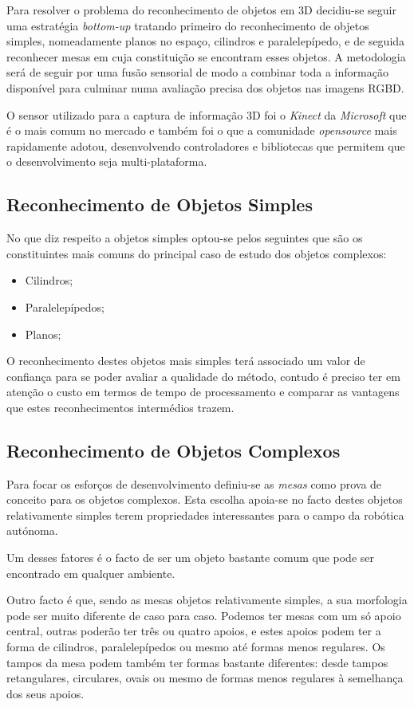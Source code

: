Para resolver o problema do reconhecimento de objetos em 3D decidiu-se seguir uma estratégia \emph{bottom-up} tratando primeiro do reconhecimento de objetos simples, nomeadamente planos no espaço, cilindros e paralelepípedo, e de seguida reconhecer mesas em cuja constituição se encontram esses objetos. A metodologia será de seguir por uma fusão sensorial de modo a combinar toda a informação disponível para culminar numa avaliação precisa dos objetos nas imagens RGBD.

O sensor utilizado para a captura de informação 3D foi o \emph{Kinect} da \emph{Microsoft} que é o mais comum no mercado e também foi o que a comunidade \emph{opensource} mais rapidamente adotou, desenvolvendo controladores e bibliotecas que permitem que o desenvolvimento seja multi-plataforma.


\subsection{Reconhecimento de Objetos Simples}

No que diz respeito a objetos simples optou-se pelos seguintes que são os constituintes mais comuns
do principal caso de estudo dos objetos complexos:
\begin{itemize}
\item Cilindros;
\item Paralelepípedos;
\item Planos;
\end{itemize}

O reconhecimento destes objetos mais simples terá associado um valor de confiança para se poder avaliar a qualidade do método, contudo é preciso ter em atenção o custo em termos de tempo de processamento e comparar as vantagens que estes reconhecimentos intermédios trazem.
 
\subsection{Reconhecimento de Objetos Complexos}

Para focar os esforços de desenvolvimento definiu-se as \emph{mesas} como prova de conceito para os objetos complexos. Esta escolha apoia-se no facto destes objetos relativamente simples terem propriedades interessantes para o campo da robótica autónoma.

Um desses fatores é o facto de ser um objeto bastante comum que pode ser encontrado em qualquer ambiente.

Outro facto é que, sendo as mesas objetos relativamente simples, a sua morfologia pode ser muito diferente de caso para caso. Podemos ter mesas com um só apoio central, outras poderão ter três ou quatro apoios, e estes apoios podem ter a forma de cilindros, paralelepípedos ou mesmo até formas menos regulares. Os tampos da mesa podem também ter formas bastante diferentes: desde tampos retangulares, circulares, ovais ou mesmo de formas menos regulares à semelhança dos seus apoios.

